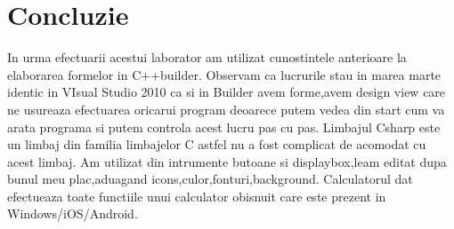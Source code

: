 \section*{Concluzie}

In urma efectuarii acestui laborator am utilizat cunostintele anterioare la elaborarea formelor in C++builder.
Observam ca lucrurile stau in marea marte identic in VIsual Studio 2010 ca si in Builder avem forme,avem design view care ne usureaza efectuarea oricarui program deoarece putem vedea din start cum va arata programa si putem controla acest lucru pas cu pas.
Limbajul Csharp este un limbaj din familia limbajelor C astfel nu a fost complicat de acomodat cu acest limbaj.
Am utilizat din intrumente butoane si displaybox,leam editat dupa bunul meu plac,aduagand icons,culor,fonturi,background.
Calculatorul dat efectueaza toate functiile unui calculator obisnuit care este prezent in Windows/iOS/Android.


\clearpage